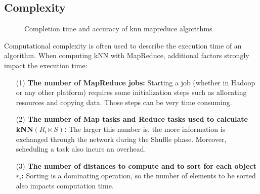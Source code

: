 \subsection{Complexity}
\begin{figure}[t]
\center
{}
\caption{Completion time and accuracy of knn mapreduce algorithms\label{experiment}}
\end{figure}
Computational complexity is often used to describe the execution time of an algorithm. When computing kNN with MapReduce, additional factors strongly impact the execution time: 
\begin{itemize}

\item[(1)] \textbf{The number of MapReduce jobs:} Starting a job (whether in 
Hadoop\cite{Jiang:2010:PMI:1920841.1920903} or any other platform) requires some initialization steps 
such as allocating resources and copying data. Those steps can be very time 
consuming.

\item[(2)] \textbf{The number of Map tasks and Reduce tasks used to calculate kNN$\left(R_i \ltimes S\right)$:} The larger this number is, the more 
information is exchanged through the network during the Shuffle phase. 
Moreover, scheduling a task also incurs an overhead.

\item[(3)] \textbf{The number of distances to compute and to sort for each object $r_i$:} Sorting is a dominating operation, so the number of elements to be 
sorted also impacts computation time.
\end{itemize} 


